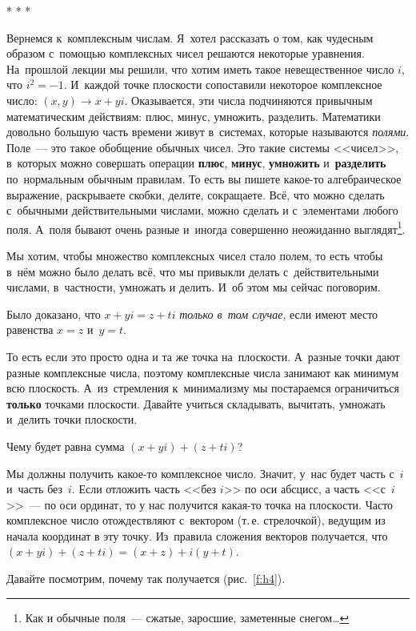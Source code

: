 \centerline{* * *}

Вернемся к~комплексным числам. Я~хотел рассказать о том, как чудесным образом с~помощью комплексных
чисел решаются некоторые уравнения. На~прошлой лекции мы решили, что хотим иметь такое
невещественное число $i$, что $i^{2} = -1$. И~каждой точке плоскости сопоставили некоторое комплексное
число: $(x,y) \to x+yi$. Оказывается, эти числа подчиняются привычным математическим действиям: плюс, минус,
умножить, разделить. Математики довольно большую часть времени живут в~системах, которые называются
\textit{полями}. Поле~--- это такое обобщение обычных чисел. Это такие системы <<чисел>>, в~которых можно
совершать операции \textbf{плюс}, \textbf{минус}, \textbf{умножить} и~\textbf{разделить} по~нормальным обычным правилам. То есть вы
пишете какое-то алгебраическое выражение, раскрываете скобки, делите, сокращаете. Всё, что можно
сделать с~обычными действительными числами, можно сделать и с~элементами любого поля.
А~поля бывают очень разные и~иногда совершенно неожиданно выглядят\footnote{Как и обычные поля~--- сжатые, заросшие, заметенные снегом\ldots}.

Мы хотим, чтобы
множество комплексных чисел стало полем, то есть чтобы в~нём можно было делать всё, что мы
привыкли делать с~действительными числами, в~частности, умножать и делить. И~об этом мы сейчас поговорим.

Было доказано, что $x+yi = z+ti$ \textit{только в~том случае}, если имеют место равенства $x=z$ и~$y=t$.

То есть если это просто одна и та же точка на~плоскости. А~разные точки дают разные комплексные числа,
поэтому комплексные числа занимают как минимум всю плоскость. А~из~стремления к~минимализму мы
постараемся ограничиться \textbf{только} точками плоскости. Давайте учиться складывать, вычитать, умножать
и~делить точки плоскости.

Чему будет равна сумма $(x+yi) + (z+ti)$?

Мы должны получить какое-то комплексное число. Значит, у~нас будет часть с~$i$ и~часть без~$i$.
Если отложить часть <<без $i$>> по оси абсцисс, а часть <<с~$i$>>~--- по оси ординат, то у нас получится
какая-то точка на плоскости. Часто комплексное число отождествляют с~вектором (т.\,е. стрелочкой),
ведущим из начала координат в эту точку. Из~правила сложения векторов получается, что $(x+yi) +
(z+ti) = (x+z) + i(y+t)$.

Давайте посмотрим, почему так получается (рис.~\ref{f:h4}).

%
%




